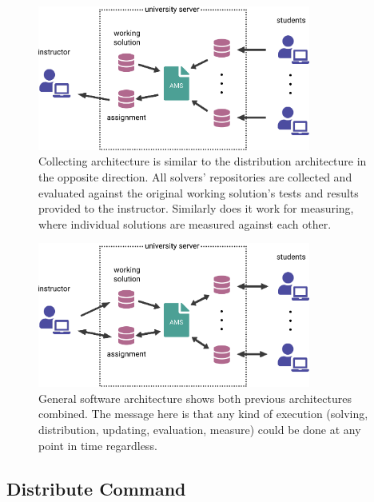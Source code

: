\begin{figure}[H]
    \centering
    \includegraphics[width=0.8\textwidth,height=\textheight,keepaspectratio]{Figures/impl/image4.png}
    \caption[Collecting architecture diagram]{Collecting architecture is similar to the distribution architecture in the opposite direction. All solvers' repositories are collected and evaluated against the original working solution's tests and results provided to the instructor. Similarly does it work for measuring, where individual solutions are measured against each other.}
\end{figure}

\begin{figure}[H]
    \centering
    \includegraphics[width=0.8\textwidth,height=\textheight,keepaspectratio]{Figures/impl/image8.png}
    \caption[General software architecture diagram]{General software architecture shows both previous architectures combined. The message here is that any kind of execution (solving, distribution, updating, evaluation, measure) could be done at any point in time regardless.}
\end{figure}

\subsection{Distribute Command}\label{ssec:distribcmd}

